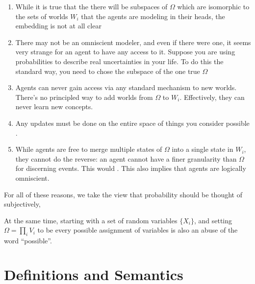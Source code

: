 \documentclass{article}
\begin{document}
	\begin{enumerate}
		\item While it is true that the there will be subspaces of $\Omega$ which are isomorphic to the sets of worlds $W_i$ that the agents are modeling in their heads, the embedding is not at all clear \todo{}

		\item There may not be an omniscient modeler, and even if there were one, it seems very strange for an agent to have any access to it. Suppose you are using probabilities to describe real uncertainties in your life. To do this the standard way, you need to chose the subspace of the one true $\Omega$ 

		\item Agents can never gain access via any standard mechanism to new worlds. There's no principled way to add worlds from $\Omega$ to $W_i$. Effectively, they can never learn new concepts.

		\item Any updates must be done on the entire space of things you consider possible .

		\item While agents are free to merge multiple states of $\Omega$ into a single state in $W_i$, they cannot do the reverse: an agent cannot have a finer granularity than $\Omega$ for discerning events. This would . This also implies that agents are logically omniscient.
	\end{enumerate}

	For all of these reasons, we take the view that probability should be thought of subjectively,


	At the same time, starting with a set of random variables $\{X_i\}$, and setting $\Omega = \prod_{i} V_i$ to be every possible assignment of variables is also an abuse of the word ``possible''.


	\section{Definitions and Semantics}
\end{document}
